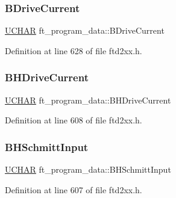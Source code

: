 \subsubsection{\texorpdfstring{B\+Drive\+Current}{BDriveCurrent}}
{\footnotesize\ttfamily \hyperlink{CatCaloProto40MHz_2inc_2WinTypes_8h_a4f4bb67531a9bf6f0b9c6ad76aeba587}{U\+C\+H\+AR} ft\+\_\+program\+\_\+data\+::\+B\+Drive\+Current}



Definition at line 628 of file ftd2xx.\+h.

\mbox{\label{structft__program__data_ab24662f43f4fc1c442baf82feccfe045}} 
\subsubsection{\texorpdfstring{B\+H\+Drive\+Current}{BHDriveCurrent}}
{\footnotesize\ttfamily \hyperlink{CatCaloProto40MHz_2inc_2WinTypes_8h_a4f4bb67531a9bf6f0b9c6ad76aeba587}{U\+C\+H\+AR} ft\+\_\+program\+\_\+data\+::\+B\+H\+Drive\+Current}



Definition at line 608 of file ftd2xx.\+h.

\mbox{\label{structft__program__data_ac8225d9a9c8e12cde47c1d7d99c9eb4c}} 
\subsubsection{\texorpdfstring{B\+H\+Schmitt\+Input}{BHSchmittInput}}
{\footnotesize\ttfamily \hyperlink{CatCaloProto40MHz_2inc_2WinTypes_8h_a4f4bb67531a9bf6f0b9c6ad76aeba587}{U\+C\+H\+AR} ft\+\_\+program\+\_\+data\+::\+B\+H\+Schmitt\+Input}



Definition at line 607 of file ftd2xx.\+h.

\mbox{\label{structft__program__data_aa8140bee7add5ffdf7d4354307833137}} 
